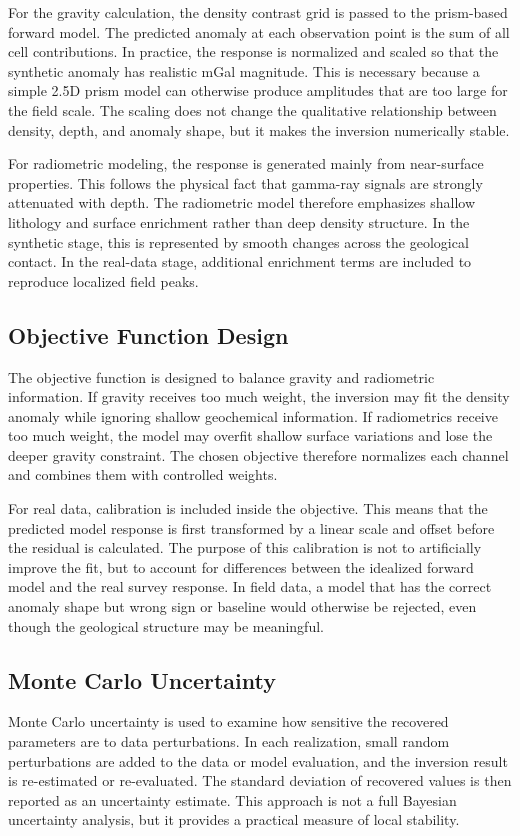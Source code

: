 \documentclass[12pt,a4paper]{article}
\begin{document}
For the gravity calculation, the density contrast grid is passed to the prism-based forward model. The predicted anomaly at each observation point is the sum of all cell contributions. In practice, the response is normalized and scaled so that the synthetic anomaly has realistic mGal magnitude. This is necessary because a simple 2.5D prism model can otherwise produce amplitudes that are too large for the field scale. The scaling does not change the qualitative relationship between density, depth, and anomaly shape, but it makes the inversion numerically stable.

For radiometric modeling, the response is generated mainly from near-surface properties. This follows the physical fact that gamma-ray signals are strongly attenuated with depth. The radiometric model therefore emphasizes shallow lithology and surface enrichment rather than deep density structure. In the synthetic stage, this is represented by smooth changes across the geological contact. In the real-data stage, additional enrichment terms are included to reproduce localized field peaks.

\subsection{Objective Function Design}
The objective function is designed to balance gravity and radiometric information. If gravity receives too much weight, the inversion may fit the density anomaly while ignoring shallow geochemical information. If radiometrics receive too much weight, the model may overfit shallow surface variations and lose the deeper gravity constraint. The chosen objective therefore normalizes each channel and combines them with controlled weights.

For real data, calibration is included inside the objective. This means that the predicted model response is first transformed by a linear scale and offset before the residual is calculated. The purpose of this calibration is not to artificially improve the fit, but to account for differences between the idealized forward model and the real survey response. In field data, a model that has the correct anomaly shape but wrong sign or baseline would otherwise be rejected, even though the geological structure may be meaningful.

\subsection{Monte Carlo Uncertainty}
Monte Carlo uncertainty is used to examine how sensitive the recovered parameters are to data perturbations. In each realization, small random perturbations are added to the data or model evaluation, and the inversion result is re-estimated or re-evaluated. The standard deviation of recovered values is then reported as an uncertainty estimate. This approach is not a full Bayesian uncertainty analysis, but it provides a practical measure of local stability.
\end{document}

